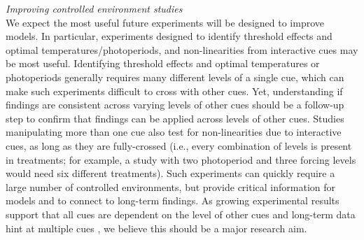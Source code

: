 \documentclass[11pt,letter]{article}
\begin{document}
\emph{Improving controlled environment studies}\\
We expect the most useful future experiments will be designed to improve models. In particular, experiments designed to identify threshold effects and optimal temperatures/photoperiods, and non-linearities from interactive cues may be most useful. Identifying threshold effects and optimal temperatures or photoperiods generally requires many different levels of a single cue, which can make such experiments difficult to cross with other cues. Yet, understanding if findings are consistent across varying levels of other cues should be a follow-up step to confirm that findings can be applied across levels of other cues. Studies manipulating more than one cue also test for non-linearities due to interactive cues, as long as they are fully-crossed (i.e., every combination of levels is present in treatments; for example, a study with two photoperiod and three forcing levels would need six different treatments). Such experiments can quickly require a large number of controlled environments, but provide critical information for models and to connect to long-term findings. As growing experimental results support that all cues are dependent on the level of other cues \citep{stearns1958,flynn2018} and long-term data hint at multiple cues \citep{fu2015}, we believe this should be a major research aim.\\
\end{document}
